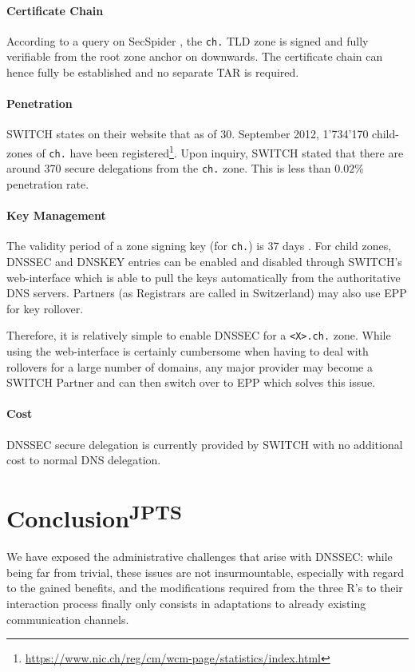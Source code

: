 \documentclass[a4paper,twocolumn]{scrartcl}
\newcommand{\wbjp}{\textsuperscript{JP}}
\newcommand{\wbts}{\textsuperscript{TS}}
\begin{document}
\paragraph{Certificate Chain} According to a query on SecSpider
\cite{secspider}, the \verb|ch.| TLD zone is signed and fully
verifiable from the root zone anchor on downwards. The certificate
chain can hence fully be established and no separate TAR is required.

\paragraph{Penetration} SWITCH states on their website that as of
30. September 2012, 1'734'170 child-zones of \verb|ch.| have been
registered\footnote{\url{https://www.nic.ch/reg/cm/wcm-page/statistics/index.html}}. Upon
inquiry, SWITCH stated that there are around 370 secure delegations
from the \verb|ch.| zone. This is less than $0.02\%$ penetration
rate.

\paragraph{Key Management} The validity period of a zone signing key
(for \verb|ch.|) is 37 days \cite{switch10}. For child zones,  DNSSEC
and DNSKEY entries can be enabled and disabled through SWITCH's 
web-interface which is able to pull the keys automatically from the
authoritative DNS servers. Partners (as Registrars are called in
Switzerland) may also use EPP for key rollover.

Therefore, it is relatively simple to enable DNSSEC for a \verb|<X>.ch.| 
zone. While using the web-interface is certainly cumbersome when
having to deal with rollovers for a large number of domains, any major
provider may become a SWITCH Partner and can then switch over to EPP
which solves this issue.


\paragraph{Cost} DNSSEC secure delegation is currently provided by
SWITCH with no additional cost to normal DNS delegation.

\section{Conclusion\wbjp\wbts}
We have exposed the administrative challenges that arise with DNSSEC: while being far from trivial, these issues are not insurmountable, especially with regard to the gained benefits, and the modifications required from the three R's to their interaction process finally only consists in adaptations to already existing communication channels.
\end{document}
